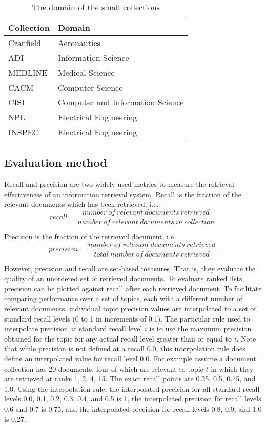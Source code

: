 \begin{table}[bht]
\vspace*{-5mm}
  \begin{center}
    \caption{The domain of the small collections}
    \vspace{3mm}
    \begin{tabular}{|l||l|} \hline
Collection & Domain\\ \hline
Cranfield & Aeronautics\\
ADI       & Information Science\\
MEDLINE   & Medical Science\\
CACM      & Computer Science\\
CISI      & Computer and Information Science\\
NPL       & Electrical Engineering\\
INSPEC    & Electrical Engineering\\ \hline
    \end{tabular}
    \label{tab:SmallDomain}
  \end{center}
\end{table} 



\subsection{Evaluation method}
Recall and precision are two widely used metrics to measure the retrieval effectiveness of an information retrieval system.
Recall is the fraction of the relevant documents which has been retrieved, i.e.
\[recall = \frac{number~of~relevant~documents~retrieved}{number~of~relevant~documents~in~collection}.\]

\newpage
\noindent
Precision is the fraction of the retrieved document, i.e.
\[precision = \frac{number~of~relevant~documents~retrieved}{total~number~of~documents~retrieved}.\]

However, precision and recall are set-based measures. That is, they evaluate the quality of an unordered set of retrieved documents. To evaluate ranked lists, precision can be plotted against recall after each retrieved document. To facilitate comparing performance over a set of topics, each with a different number of relevant documents, individual topic precision values are interpolated to a set of standard recall levels (0 to 1 in increments of 0.1). The particular rule used to interpolate precision at standard recall level $i$ is to use the maximum precision obtained for the topic for any actual recall level greater than or equal to $i$. Note that while precision is not defined at a recall 0.0, this interpolation rule does define an interpolated value for recall level 0.0.
For example assume a document collection has 20 documents, four of which are relevant to topic $t$ in which they are retrieved at ranks 1, 2, 4, 15. The exact recall points are 0.25, 0.5, 0.75, and 1.0. Using the interpolation rule, the interpolated precision for all standard recall levels 0.0, 0.1, 0.2, 0.3, 0.4, and 0.5 is 1, the interpolated precision for recall levels 0.6 and 0.7 is 0.75, and the interpolated precision for recall levels 0.8, 0.9, and 1.0 is 0.27.


